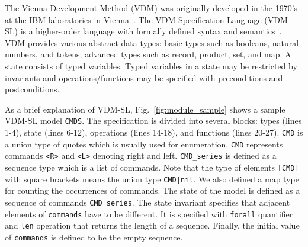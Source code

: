 
The Vienna Development Method (VDM) was originally developed in the 1970's at the IBM laboratories in Vienna~\cite{DBLP:conf/fm/1978}. The VDM Specification Language (VDM-SL) is a higher-order language with formally defined syntax and semantics~\cite{Prehn:1991:LNCS551,Larsen1995585}. VDM provides various abstract data types: basic types such as booleans, natural numbers, and tokens; advanced types such as record, product, set, and map. A state consists of typed variables. Typed variables in a state may be restricted by invariants and operations/functions may be specified with preconditions and postconditions.

As a brief explanation of VDM-SL, Fig.~\ref{fig:module_sample} shows a sample VDM-SL model {\tt CMDS}. The specification is divided into several blocks: types (lines 1-4), state (lines 6-12), operations (lines 14-18), and functions (lines 20-27). {\tt CMD} is a union type of quotes which is usually used for enumeration. {\tt CMD} represents commands {\tt <R>} and {\tt <L>} denoting right and left. {\tt CMD\_series} is defined as a sequence type which is a list of commands. Note that the type of elements {\tt [CMD]} with square brackets means the union type {\tt CMD|nil}. We also defined a map type for counting the occurrences of commands. The state of the model is defined as a sequence of commands {\tt CMD\_series}. The state invariant specifies that adjacent elements of {\tt commands} have to be different. It is specified with {\tt forall} quantifier and {\tt len} operation that returns the length of a sequence. Finally, the initial value of \texttt{commands} is defined to be the empty sequence.


